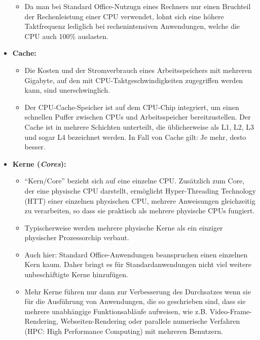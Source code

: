 \begin{itemize}
\begin{itemize}
	\item Da man bei Standard Office-Nutzugn eines Rechners nur einen Bruchteil der Rechenleistung einer CPU verwendet, lohnt sich eine höhere Taktfrequenz lediglich bei rechenintensiven Anwendungen, welche die CPU auch 100\% auslasten.
\end{itemize}
	\item \textbf{Cache:}
\begin{itemize}
	\item Die Kosten und der Stromverbrauch eines Arbeitsspeichers mit mehreren Gigabyte, auf den mit CPU-Taktgeschwindigkeiten zugegriffen werden kann, sind unerschwinglich.
	\item Der CPU-Cache-Speicher ist auf dem CPU-Chip integriert, um einen schnellen Puffer zwischen CPUs und Arbeitsspeicher bereitzustellen. Der Cache ist in mehrere Schichten unterteilt, die üblicherweise als L1, L2, L3 und sogar L4 bezeichnet werden. In Fall von Cache gilt: Je mehr, desto besser.
\end{itemize}
	\item \textbf{Kerne (\textit{Cores}):}
\begin{itemize}
	\item 	``Kern/Core'' bezieht sich auf eine einzelne CPU. Zusätzlich zum Core, der eine physische CPU darstellt, ermöglicht Hyper-Threading Technology (HTT) einer einzelnen physischen CPU, mehrere Anweisungen gleichzeitig zu verarbeiten, so dass sie praktisch als mehrere physische CPUs fungiert.
	\item Typischerweise werden mehrere physische Kerne als ein einziger physischer Prozessorchip verbaut.
	\item Auch hier: Standard Office-Anwendungen beanspruchen einen einzelnen Kern kaum. Daher bringt es für Standardanwendungen nicht viel weitere unbeschäftigte Kerne hinzufügen.
	\item Mehr Kerne führen nur dann zur Verbesserung des Durchsatzes wenn sie für die Ausführung von Anwendungen, die so geschrieben sind, dass sie mehrere unabhängige Funktionsabläufe aufweisen, wie z.B. Video-Frame-Rendering, Webseiten-Rendering oder parallele numerische Verfahren (HPC: High Performance Computing) mit mehreren Benutzern.
\end{itemize}
\end{itemize}








